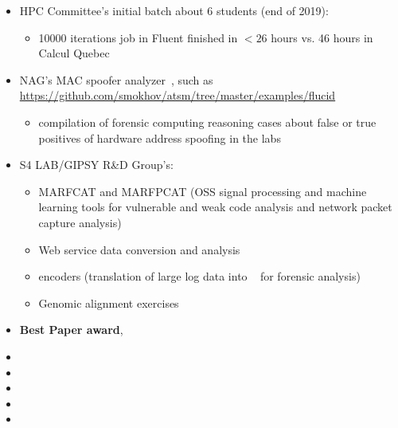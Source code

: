 \documentclass{easychair}
\begin{document}
\begin{itemize}
	\item HPC Committee's initial batch about 6 students (end of 2019):
	\begin{itemize}
		\item 10000 iterations job in Fluent finished in $<26$ hours vs. 46 hours in Calcul Quebec
	\end{itemize}

	\item NAG's MAC spoofer analyzer~\cite{mac-spoofer-analyzer-intro-c3s2e2014,mac-spoofer-analyzer-detail-fps2014},
	such as \url{https://github.com/smokhov/atsm/tree/master/examples/flucid}
	\begin{itemize}
		\item compilation of forensic computing reasoning cases about false or true positives of hardware address spoofing in the labs
	\end{itemize}

	\item S4 LAB/GIPSY R\&D Group's:
	\begin{itemize}
		\item MARFCAT and MARFPCAT (OSS signal processing and machine learning tools for 
		vulnerable and weak code analysis and network packet capture
		analysis)~\cite{marfcat-nlp-ai2014,marfcat-sate2010-nist,fingerprinting-mal-traffic}
		\item Web service data conversion and analysis
		\item {\flucid} encoders (translation of large log data into {\flucid}~\cite{mokhov-phd-thesis-2013} for forensic analysis)
		\item Genomic alignment exercises
	\end{itemize}

	\item \textbf{Best Paper award}, 

	\item {}
	\item {}
 	\item {}
	\item {}
 
	\item {}
 

\end{itemize}
\end{document}

